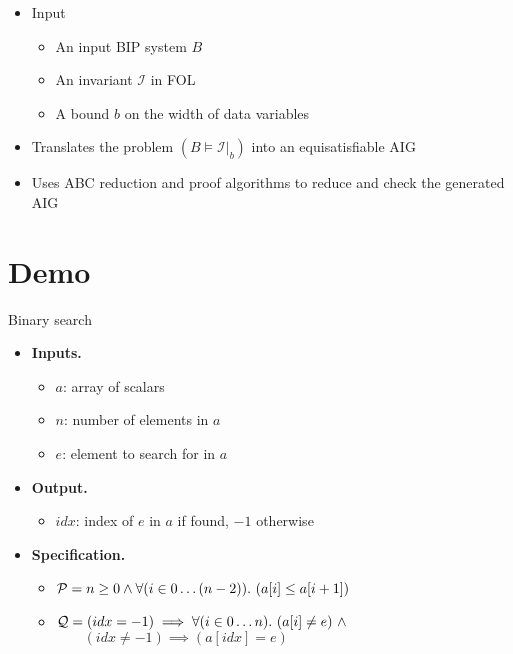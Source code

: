 \begin{frame}{\biptool}
\begin{itemize}
 \item Input
 \begin{itemize}
  \item An input BIP system $B$
  \item An invariant $\mathcal{I}$ in FOL
  \item A bound $b$ on the width of data variables
  \end{itemize}
  \item Translates the problem $\left( B \models \mathcal{I}|_b \right)$ into an equisatisfiable AIG
  \item Uses ABC reduction and proof algorithms to reduce and check the generated AIG
\end{itemize}
\end{frame}

\section{Demo}
\begin{frame}{Binary search}
\begin{itemize}
 \item {\bf Inputs.}
 \begin{itemize}
  \item $a$: array of scalars
  \item $n$: number of elements in $a$
  \item $e$: element to search for in $a$
 \end{itemize}
 \item {\bf Output.}
  \begin{itemize}
   \item $idx$: index of $e$ in $a$ if found, $-1$ otherwise
  \end{itemize}
 \item {\bf Specification.}
  \begin{itemize}
   \item 
    $\mathcal{P} = n \geq 0 \land \forall{(i \in 0\ldots(n-2))}.~(a[i] \leq a[i+1])$
   \item 
    $\mathcal{Q} = (idx = -1) \implies \forall{(i \in 0\ldots n)}.~(a[i] \neq e) ~\land$ \\
    $\quad\quad(idx \neq -1) \implies (a[idx] = e)$
  \end{itemize}
\end{itemize}
\end{frame}

